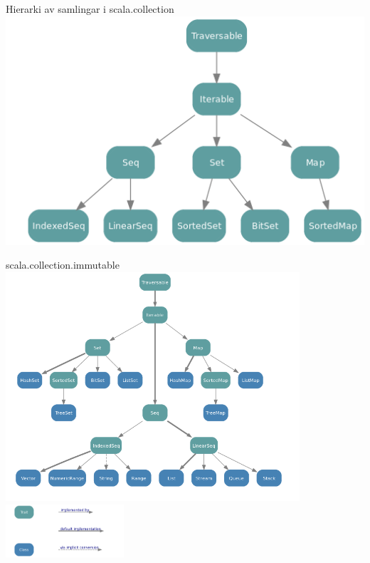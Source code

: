 \begin{Slide}{Hierarki av samlingar i scala.collection}
\includegraphics[width=1.0\textwidth]{../img/collection/collection-traits}
\end{Slide}

\begin{Slide}{scala.collection.immutable}
\includegraphics[width=0.82\textwidth]{../img/collection/collection-immutable}
\includegraphics[width=0.33\textwidth]{../img/collection/collection-legend}
\end{Slide}

